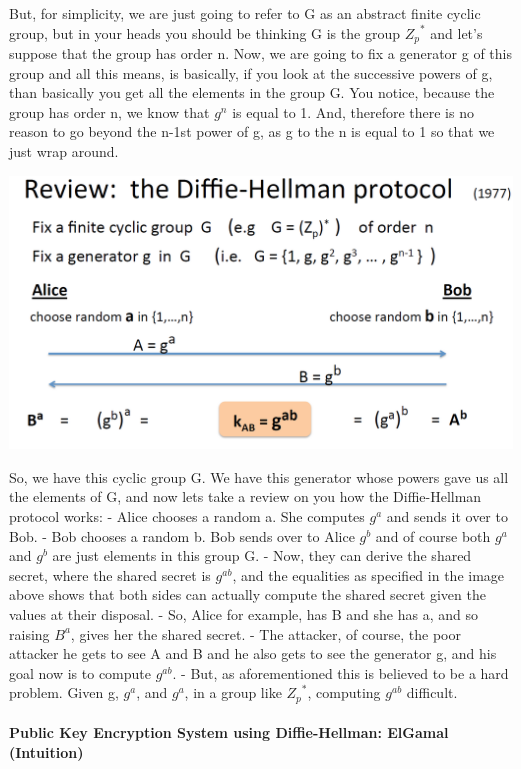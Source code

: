 \documentclass[11pt]{article}
\makeatletter
\def\maxwidth{\ifdim\Gin@nat@width>\linewidth\linewidth
    \else\Gin@nat@width\fi}
\let\Oldincludegraphics\includegraphics
\renewcommand{\includegraphics}[1]{\Oldincludegraphics[width=.8\maxwidth]{#1}}
\makeatother
\begin{document}
But, for simplicity, we are just going to refer to G as an abstract
finite cyclic group, but in your heads you should be thinking G is the
group \({Z_{p}}^{*}\) and let's suppose that the group has order n. Now,
we are going to fix a generator g of this group and all this means, is
basically, if you look at the successive powers of g, than basically you
get all the elements in the group G. You notice, because the group has
order n, we know that \(g^{n}\) is equal to 1. And, therefore there is
no reason to go beyond the n-1st power of g, as g to the n is equal to 1
so that we just wrap around.

\includegraphics{./Images/DH-Review.png}

So, we have this cyclic group G. We have this generator whose powers
gave us all the elements of G, and now lets take a review on you how the
Diffie-Hellman protocol works: - Alice chooses a random a. She computes
\(g^{a}\) and sends it over to Bob. - Bob chooses a random b. Bob sends
over to Alice \(g^{b}\) and of course both \(g^{a}\) and \(g^{b}\) are
just elements in this group G. - Now, they can derive the shared secret,
where the shared secret is \(g^{ab}\), and the equalities as specified
in the image above shows that both sides can actually compute the shared
secret given the values at their disposal. - So, Alice for example, has
B and she has a, and so raising \(B^{a}\), gives her the shared secret.
- The attacker, of course, the poor attacker he gets to see A and B and
he also gets to see the generator g, and his goal now is to compute
\(g^{ab}\). - But, as aforementioned this is believed to be a hard
problem. Given g, \(g^{a}\), and \(g^{a}\), in a group like
\({Z_{p}}^{*}\), computing \(g^{ab}\) difficult.

\hypertarget{public-key-encryption-system-using-diffie-hellman-elgamal-intuition}{%
\paragraph{Public Key Encryption System using Diffie-Hellman: ElGamal
(Intuition)}\label{public-key-encryption-system-using-diffie-hellman-elgamal-intuition}}
\end{document}
